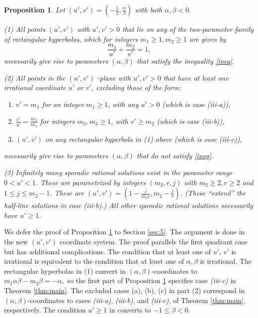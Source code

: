 \documentclass[12pt,letterpaper, reqno]{amsart}
\newtheorem{prop}[thm]{Proposition}
\theoremstyle{definition}
\theoremstyle{remark}
\newcommand{\uu}{{u'}}
\newcommand{\vv}{{v'}}
\begin{document}
%
%
\begin{prop}\label{prop:32} {} 
Let $(\uu, \vv) = (-\frac{1}{\beta}, \frac{\alpha}{\beta})$ with both $\alpha, \beta <0$.

(1)  All points $(\uu, \vv)$ with $\uu, \vv >0$ that lie on any of  the two-parameter family of rectangular hyperbolas,
which for  integers $m_1 \ge 1, m_2 \ge 1$ are given by
$$\frac{m_1}{\uu} + \frac{m_2}{\vv} =1,$$
necessarily  give rise to  parameters $(\alpha, \beta)$
that satisfy  the inequality \eqref{ineq}.

(2) All points in the $(\uu, \vv)$ -plane with $\uu, \vv>0$ that
have at least one irrational coordinate $\uu$ or $\vv$,
excluding those of the form: 
\begin{enumerate}
\item[(a)]
$\vv = {m_1}$ for an integer $m_1 \ge 1$, with any  $\uu >0$
(which is  case {\it (iii-a)}),
\item[(b)]
 $\frac{\vv}{\uu} = \frac{m_2}{m_3}$ for integers $m_2, m_3 \ge 1$, with $\vv \geq {m_2}$
 (which is  case {\it (iii-b)}),
\item[(c)] $(\uu, \vv)$  on any rectangular hyperbola in (1) above 
(which is  case {\it (iii-c)}),
\end{enumerate}
necessarily give rise to  parameters $(\alpha, \beta)$ that do not satisfy  \eqref{ineq}.

(3) Infinitely many sporadic rational solutions exist in the parameter range $0< {\uu} <1$. 
These are parametrized by integers $(m_2, r, j)$ with $m_2 \ge 2, r\ge 2$ and $1 \le j \le m_2-1$.
These are $(\uu, \vv)=( 1-\frac{j}{m_2r}, m_2 - \frac{j}{r})$.
(These ``extend'' the half-line solutions in case (iii-b).)
All other sporadic rational solutions necessarily  have ${\uu} \ge 1$.
\end{prop}


We defer the proof of Proposition \ref{prop:32} to Section \ref{sec:5}. 
The argument is done in the new $(\uu, \vv)$ coordinate system.
The proof parallels the first quadrant case but has additional  complications.
The condition that at least one of $\uu$, $\vv$ is irrational is equivalent
to the condition that at least one of $\alpha, \beta$ is irrational.  The
rectangular hyperbolas in (1)  convert in $(\alpha, \beta)$-coordinates
to $m_1 \alpha \beta - m_2 \beta= - \alpha,$
so the first part of Proposition \ref{prop:32} specifies case {\it (iii-c)} in
Theorem \ref{thm:main}. 
The excluded cases (a), (b), (c) in part (2) correspond  in $(\alpha, \beta)$-coordinates to cases 
{\it (iii-a)}, {\it (iii-b)}, and {\it (iii-c)}, of Theorem \ref{thm:main}, respectively.
The condition ${\uu} \ge 1$ in  converts to $-1 \le \beta <0.$ 
\end{document}
